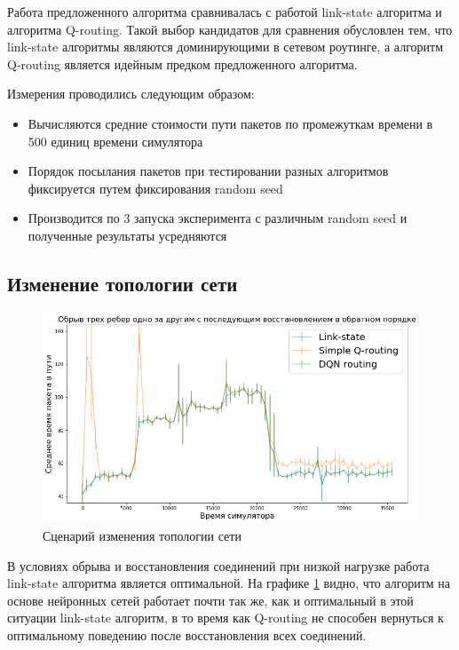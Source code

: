 \documentclass[specification, annotation]{itmo-student-thesis}
\begin{document}
Работа предложенного алгоритма сравнивалась с работой link-state алгоритма и
алгоритма Q-routing. Такой выбор кандидатов для сравнения обусловлен тем, что
link-state алгоритмы являются доминирующими в сетевом роутинге, а алгоритм
Q-routing является идейным предком предложенного алгоритма.

Измерения проводились следующим образом:

\begin{itemize}
  \item Вычисляются средние стоимости пути пакетов по промежуткам времени в 500
    единиц времени симулятора
  \item Порядок посылания пакетов при тестировании разных алгоритмов фиксируется
    путем фиксирования random seed
  \item Производится по 3 запуска эксперимента с различным random seed и
    полученные результаты усредняются
\end{itemize}

\subsection{Изменение топологии сети}\label{experiments:simple/links}

\begin{figure}[!h]
  \caption{Сценарий изменения топологии сети}\label{experiment-link-failures}
  \centering
  \includegraphics[scale=0.6]{experiment-link-failures}
\end{figure}

В условиях обрыва и восстановления соединений при низкой нагрузке работа
link-state алгоритма является оптимальной. На графике
\ref{experiment-link-failures} видно, что алгоритм на основе нейронных сетей
работает почти так же, как и оптимальный в этой ситуации link-state алгоритм, в
то время как Q-routing не способен вернуться к оптимальному поведению после
восстановления всех соединений.
\end{document}
